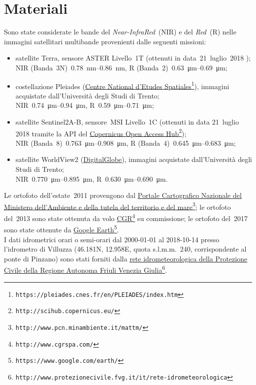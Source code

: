 \section{Materiali}
Sono state considerate le bande del \emph{Near-InfraRed}~(NIR) e del \emph{Red}~(R) nelle immagini satellitari multibande provenienti dalle seguenti missioni:
%
\begin{itemize}
	\item satellite Terra, sensore ASTER Livello~1T (ottenuti in data~21~luglio~2018 );  
		\\
		NIR (Banda~3N)~\SIrange[range-phrase={-}]{0.78}{0.86}{\nano\m}, R (Banda~2)~\SIrange[range-phrase={-}]{0.63}{0.69}{\micro\m};
	\item costellazione Pleiades (\href{https://pleiades.cnes.fr/en/PLEIADES/index.htm}{Centre National d'Etudes Spatiales}\footnote{\texttt{https://pleiades.cnes.fr/en/PLEIADES/index.htm}}), immagini acquistate dall'Università degli Studi di Trento; 
		\\
		NIR~\SIrange[range-phrase={-}]{0.74}{0.94}{\micro\m}, R~\SIrange[range-phrase={-}]{0.59}{0.71}{\micro\m};
	\item satellite Sentinel2A-B, sensore~MSI Livello~1C (ottenuti in data 21~luglio 2018 tramite la API del \href{http://scihub.copernicus.eu/}{Copernicus Open Access Hub}\footnote{\texttt{http://scihub.copernicus.eu/}});
		\\
		NIR (Banda~8)~\SIrange[range-phrase={-}]{0.763}{0.908}{\micro\m}, R (Banda~4)~\SIrange[range-phrase={-}]{0.645}{0.683}{\micro\m};
	\item satellite WorldView2  (\href{https://dg-cms-uploads-production.s3.amazonaws.com/uploads/document/file/98/WorldView2-DS-WV2-rev2.pdf}{DigitalGlobe}), immagini acquistate dall'Università degli Studi di Trento;
		\\
		NIR~\SIrange[range-phrase={-}]{0.770}{0.895}{\micro\m}, R~\SIrange[range-phrase={-}]{0.630}{0.690}{\micro\m}.
\end{itemize}
%

Le ortofoto dell'estate~2011 provengono dal \href{http://www.pcn.minambiente.it/mattm/}{Portale Cartografico Nazionale del Ministero dell'Ambiente e della tutela del territorio e del mare}\footnote{\texttt{http://www.pcn.minambiente.it/mattm/}};
le ortofoto del~2013 sono state ottenuta da volo \href{http://www.cgrspa.com/}{CGR}\footnote{\texttt{http://www.cgrspa.com/}} su commissione; 
le ortofoto del~2017 sono state ottenute da \href{https://www.google.com/earth/}{Google Earth}\footnote{\texttt{https://www.google.com/earth/}}.
\\
I dati idrometrici orari o semi-orari dal 2000-01-01 al 2018-10-14 presso l'idrometro di Villuzza (\num{46.181}N, \num{12.958}E, quota s.l.m.m.~\num{240}, corrispondente al ponte di Pinzano) sono stati forniti dalla \href{http://www.protezionecivile.fvg.it/it/rete-idrometeorologica}{rete idrometeorologica della Protezione Civile della Regione Autonoma Friuli Venezia Giulia}\footnote{\texttt{http://www.protezionecivile.fvg.it/it/rete-idrometeorologica}}.

